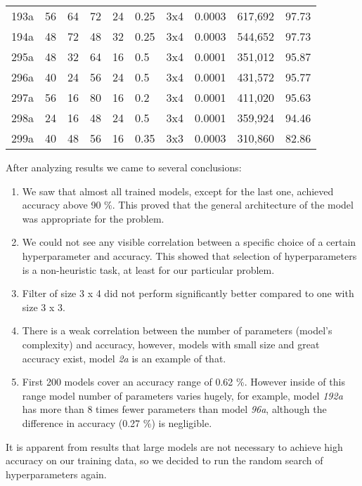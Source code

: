 \begin{table}[ht]
\begin{tabular}{llllllllrl}
      193a & 56 & 64 & 72 & 24 & 0.25 & 3x4 & 0.0003 &   617,692 & 97.73\\
      194a & 48 & 72 & 48 & 32 & 0.25 & 3x4 & 0.0003 &   544,652 & 97.73\\\midrule
      295a & 48 & 32 & 64 & 16 & 0.5  & 3x4 & 0.0001 &   351,012 & 95.87\\
      296a & 40 & 24 & 56 & 24 & 0.5  & 3x4 & 0.0001 &   431,572 & 95.77\\
      297a & 56 & 16 & 80 & 16 & 0.2  & 3x4 & 0.0001 &   411,020 & 95.63\\
      298a & 24 & 16 & 48 & 24 & 0.5  & 3x4 & 0.0001 &   359,924 & 94.46\\
      299a & 40 & 48 & 56 & 16 & 0.35 & 3x3 & 0.0003 &   310,860 & 82.86\\\bottomrule
    \end{tabular}
    \label{hyper_results1}
\end{table}

After analyzing results we came to several conclusions:

\begin{enumerate}
    \item We saw that almost all trained models, except for the last one, achieved accuracy above 90 \%. This proved that the general architecture of the model was appropriate for the problem.
    \item We could not see any visible correlation between a specific choice of a certain hyperparameter and accuracy. This showed that selection of hyperparameters is a non-heuristic task, at least for our particular problem.
    \item Filter of size 3 x 4 did not perform significantly better compared to one with size 3 x 3. 
    \item There is a weak correlation between the number of parameters (model's complexity) and accuracy, however, models with small size and great accuracy exist, model \textit{2a} is an example of that.
    \item First 200 models cover an accuracy range of 0.62 \%. However inside of this range model number of parameters varies hugely, for example, model \textit{192a} has more than 8 times fewer parameters than model \textit{96a}, although the difference in accuracy (0.27 \%) is negligible.
\end{enumerate}

It is apparent from results that large models are not necessary to achieve high accuracy on our training data, so we decided to run the random search of hyperparameters again.

